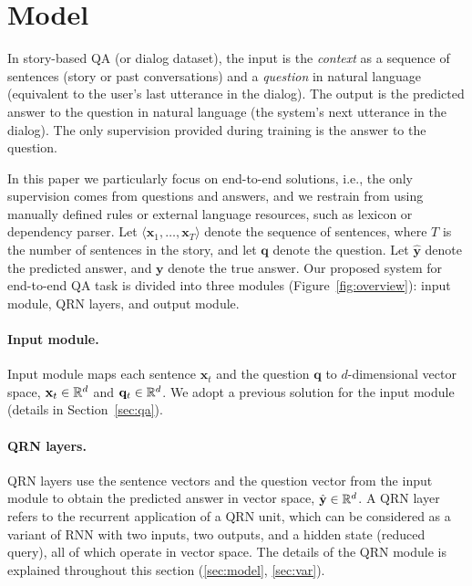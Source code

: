 \documentclass[table]{article}
\begin{document}
 
\section{Model}\label{sec:qrn}

In story-based QA (or dialog dataset), the input is the \emph{context} as a sequence of sentences (story or past conversations) and a \emph{question} in natural language (equivalent to the user's last utterance in the dialog). 
The output is the predicted answer to the question in natural language (the system's next utterance in the dialog).
The only supervision provided during training is the answer to the question. 





In this paper we particularly focus on end-to-end solutions, i.e.,  the only supervision comes from questions and answers, and we restrain from using manually defined rules or external language resources, such as lexicon or dependency parser. Let $\langle \bm{x}_1, \ldots, \bm{x}_T\rangle$ denote the sequence of sentences,  where $T$ is the number of sentences in the story, and let $\bm{q}$ denote the question. 
Let $\hat{\bm{y}}$ denote the predicted answer, and ${\bm{y}}$ denote the true answer.
Our proposed system for end-to-end QA task is divided into three modules (Figure~\ref{fig:overview}): input module, QRN layers, and output module.

\paragraph{Input module.} 
Input module maps each sentence $\bm{x}_t$ and the question $\bm{q}$ to $d$-dimensional vector space, ${\bf x}_t \in \mathbb{R}^d$ and ${\bf q}_t \in \mathbb{R}^d$.
We adopt a previous solution for the input module (details in Section~\ref{sec:qa}).

\paragraph{QRN layers.} 
QRN layers use the sentence vectors and the question vector from the input module to obtain the predicted answer in vector space, $\hat{\bf y} \in \mathbb{R}^d$. 
A QRN layer refers to the recurrent application of a QRN unit, which can be considered as a variant of RNN with two inputs, two outputs, and a  hidden state (reduced query), all of which operate in vector space.
The details of the QRN module is explained throughout this section (\ref{sec:model}, \ref{sec:var}).
\end{document}
